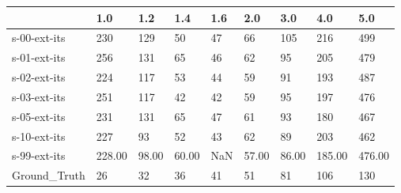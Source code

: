 \begin{tabular}{lllllllll}
\toprule
{} &    1.0 &   1.2 &   1.4 &  1.6 &   2.0 &   3.0 &    4.0 &    5.0 \\
\midrule
s-00-ext-its &    230 &   129 &    50 &   47 &    66 &   105 &    216 &    499 \\
s-01-ext-its &    256 &   131 &    65 &   46 &    62 &    95 &    205 &    479 \\
s-02-ext-its &    224 &   117 &    53 &   44 &    59 &    91 &    193 &    487 \\
s-03-ext-its &    251 &   117 &    42 &   42 &    59 &    95 &    197 &    476 \\
s-05-ext-its &    231 &   131 &    65 &   47 &    61 &    93 &    180 &    467 \\
s-10-ext-its &    227 &    93 &    52 &   43 &    62 &    89 &    203 &    462 \\
s-99-ext-its & 228.00 & 98.00 & 60.00 &  NaN & 57.00 & 86.00 & 185.00 & 476.00 \\
Ground\_Truth &     26 &    32 &    36 &   41 &    51 &    81 &    106 &    130 \\
\bottomrule
\end{tabular}
